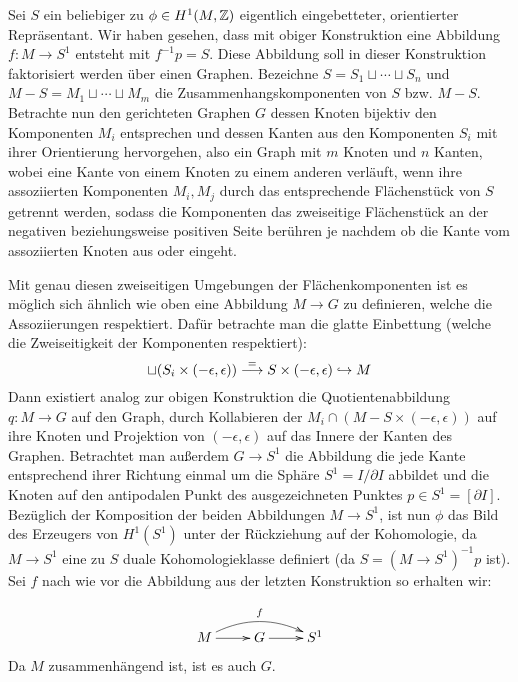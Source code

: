 \begin{constr}
	\label{constr:graph}
	Sei $S$ ein beliebiger zu $\phi \in H^1(M,\mathbb{Z})$ eigentlich eingebetteter, orientierter Repräsentant. Wir haben gesehen, dass mit obiger Konstruktion eine Abbildung $f:M\to S^1$ entsteht mit $f^{-1}p=S$. Diese Abbildung soll in dieser Konstruktion faktorisiert werden über einen Graphen.
	Bezeichne $S=S_1\sqcup \cdots \sqcup S_n$ und $M-S = M_1 \sqcup \cdots \sqcup M_m$ die Zusammenhangskomponenten von $S$ bzw. $M-S$. Betrachte nun den gerichteten Graphen $G$ dessen Knoten bijektiv den Komponenten $M_i$ entsprechen und dessen Kanten aus den Komponenten $S_i$ mit ihrer Orientierung hervorgehen, also ein Graph mit $m$ Knoten und $n$ Kanten, wobei eine Kante von einem Knoten zu einem anderen verläuft, wenn ihre assoziierten Komponenten $M_i, M_j$ durch das entsprechende Flächenstück von $S$ getrennt werden, sodass die Komponenten das zweiseitige Flächenstück an der negativen beziehungsweise positiven Seite berühren je nachdem ob die Kante vom assoziierten Knoten aus oder eingeht.

	Mit genau diesen zweiseitigen Umgebungen der Flächenkomponenten ist es möglich sich ähnlich wie oben eine Abbildung $M \to G$ zu definieren, welche die Assoziierungen respektiert. Dafür betrachte man die glatte Einbettung (welche die Zweiseitigkeit der Komponenten respektiert):
	\[
		\sqcup (S_i \times (-\epsilon,\epsilon)) \stackrel = \longrightarrow S \times (-\epsilon,\epsilon) \hookrightarrow M
	\]
	Dann existiert analog zur obigen Konstruktion die Quotientenabbildung $q:M\to G$ auf den Graph, durch Kollabieren der $M_i\cap (M -S \times(-\epsilon,\epsilon))$ auf ihre Knoten und Projektion von $(-\epsilon,\epsilon)$ auf das Innere der Kanten des Graphen. Betrachtet man außerdem $G \to S^1$ die Abbildung die jede Kante entsprechend ihrer Richtung einmal um die Sphäre $S^1 = I/\partial I$ abbildet und die Knoten auf den antipodalen Punkt des ausgezeichneten Punktes $p\in S^1 = [\partial I]$. Bezüglich der Komposition der beiden Abbildungen $M \to S^1$, ist nun $\phi$ das Bild des Erzeugers von $H^1(S^1)$ unter der Rückziehung auf der Kohomologie, da $M \to S^1$ eine zu $S$ duale Kohomologieklasse definiert (da $S=(M\to S^1)^{-1}p$ ist). Sei $f$ nach wie vor die Abbildung aus der letzten Konstruktion so erhalten wir:
	
	\begin{align}
		\begin{xy}
				\xymatrix{M \ar[r] \ar@/^1pc/[rr]^f & G \ar[r] & S^1 }
			\end{xy}
		\label{eq:graphlift}
	\end{align}
	Da $M$ zusammenhängend ist, ist es auch $G$.
\end{constr}

